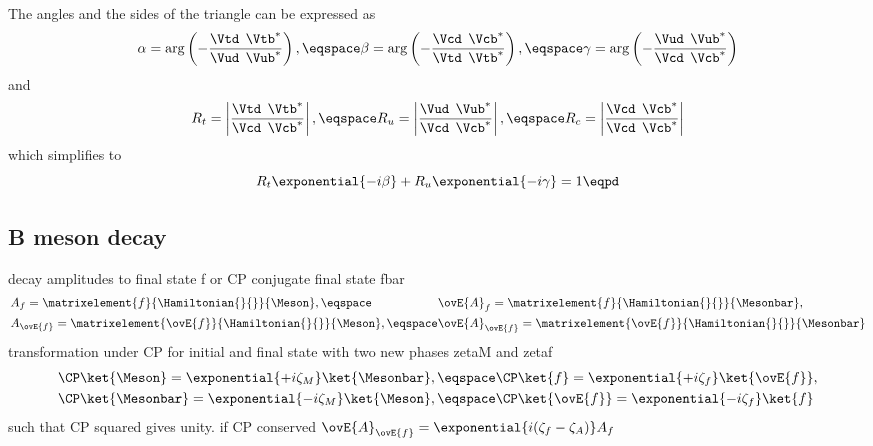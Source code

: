 The angles and the sides of the triangle can be expressed as
%
\begin{equation}
  \alpha = \arg\left(-\frac{\Vtd^{\phantom{\ast}}\Vtb^{\ast}}{\Vud^{\phantom{\ast}}\Vub^{\ast}}\right),\eqspace 
  \beta =  \arg\left(-\frac{\Vcd^{\phantom{\ast}}\Vcb^{\ast}}{\Vtd^{\phantom{\ast}}\Vtb^{\ast}}\right),\eqspace 
  \gamma = \arg\left(-\frac{\Vud^{\phantom{\ast}}\Vub^{\ast}}{\Vcd^{\phantom{\ast}}\Vcb^{\ast}}\right)
\end{equation}
%
and
%
\begin{equation}
  R_t = \left| \frac{\Vtd^{\phantom{\ast}}\Vtb^{\ast}}{\Vcd^{\phantom{\ast}}\Vcb^{\ast}} \right|,\eqspace
  R_u = \left| \frac{\Vud^{\phantom{\ast}}\Vub^{\ast}}{\Vcd^{\phantom{\ast}}\Vcb^{\ast}} \right|,\eqspace
  R_c = \left| \frac{\Vcd^{\phantom{\ast}}\Vcb^{\ast}}{\Vcd^{\phantom{\ast}}\Vcb^{\ast}} \right|
\end{equation}
%
which simplifies to
%
\begin{equation}
  R_t \exponential{-i\beta} + R_u \exponential{-i\gamma} = 1 \eqpd
\end{equation}
%


\subsection{B meson decay}
\label{sec:cpv_theory:flavour_physics:bdecays}

decay amplitudes to final state f or CP conjugate final state fbar
%
\begin{equation}
  \begin{alignedat}{2}
    & A_f         = \matrixelement{f}{\Hamiltonian{}{}}{\Meson},        \eqspace && \ovE{A}_f         = \matrixelement{f}{\Hamiltonian{}{}}{\Mesonbar}, \\
    & A_{\ovE{f}} = \matrixelement{\ovE{f}}{\Hamiltonian{}{}}{\Meson},  \eqspace && \ovE{A}_{\ovE{f}} = \matrixelement{\ovE{f}}{\Hamiltonian{}{}}{\Mesonbar}
  \end{alignedat}
\end{equation}
%
transformation under CP for initial and final state with two new phases zetaM and zetaf
%
\begin{equation}
  \begin{alignedat}{2}
    & \CP\ket{\Meson}    = \exponential{+i\zeta_{M}} \ket{\Mesonbar},\eqspace && \CP \ket{f}        = \exponential{+i\zeta_{f}} \ket{\ovE{f}}, \\
    & \CP\ket{\Mesonbar} = \exponential{-i\zeta_{M}} \ket{\Meson}   ,\eqspace && \CP \ket{\ovE{f}}  = \exponential{-i\zeta_{f}} \ket{f}
  \end{alignedat}
\end{equation}
%
such that CP squared gives unity. if CP conserved $\ovE{A}_{\ovE{f}} = \exponential{i(\zeta_f - \zeta_A)} A_f$

